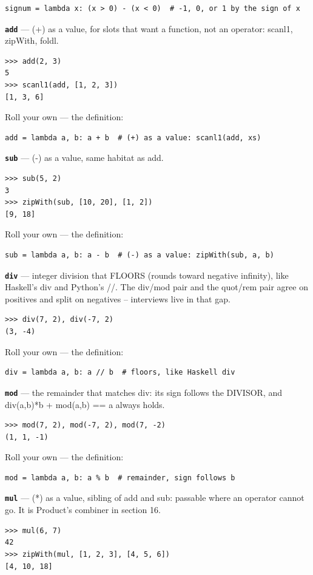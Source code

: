 \documentclass[10pt,letterpaper]{article}
\begin{document}
\begin{lstlisting}[style=ex]
signum = lambda x: (x > 0) - (x < 0)  # -1, 0, or 1 by the sign of x
\end{lstlisting}
\textbf{\texttt{add}} --- (+) as a value, for slots that want a function, not an operator: scanl1, zipWith, foldl.
\begin{lstlisting}[style=ex]
>>> add(2, 3)
5
>>> scanl1(add, [1, 2, 3])
[1, 3, 6]
\end{lstlisting}

Roll your own --- the definition:

\begin{lstlisting}[style=ex]
add = lambda a, b: a + b  # (+) as a value: scanl1(add, xs)
\end{lstlisting}
\textbf{\texttt{sub}} --- (-) as a value, same habitat as add.
\begin{lstlisting}[style=ex]
>>> sub(5, 2)
3
>>> zipWith(sub, [10, 20], [1, 2])
[9, 18]
\end{lstlisting}

Roll your own --- the definition:

\begin{lstlisting}[style=ex]
sub = lambda a, b: a - b  # (-) as a value: zipWith(sub, a, b)
\end{lstlisting}
\textbf{\texttt{div}} --- integer division that FLOORS (rounds toward negative infinity), like Haskell's div and Python's //. The div/mod pair and the quot/rem pair agree on positives and split on negatives -- interviews live in that gap.
\begin{lstlisting}[style=ex]
>>> div(7, 2), div(-7, 2)
(3, -4)
\end{lstlisting}

Roll your own --- the definition:

\begin{lstlisting}[style=ex]
div = lambda a, b: a // b  # floors, like Haskell div
\end{lstlisting}
\textbf{\texttt{mod}} --- the remainder that matches div: its sign follows the DIVISOR, and div(a,b)*b + mod(a,b) == a always holds.
\begin{lstlisting}[style=ex]
>>> mod(7, 2), mod(-7, 2), mod(7, -2)
(1, 1, -1)
\end{lstlisting}

Roll your own --- the definition:

\begin{lstlisting}[style=ex]
mod = lambda a, b: a % b  # remainder, sign follows b
\end{lstlisting}
\textbf{\texttt{mul}} --- (*) as a value, sibling of add and sub: passable where an operator cannot go. It is Product's combiner in section 16.
\begin{lstlisting}[style=ex]
>>> mul(6, 7)
42
>>> zipWith(mul, [1, 2, 3], [4, 5, 6])
[4, 10, 18]
\end{lstlisting}
\end{document}
